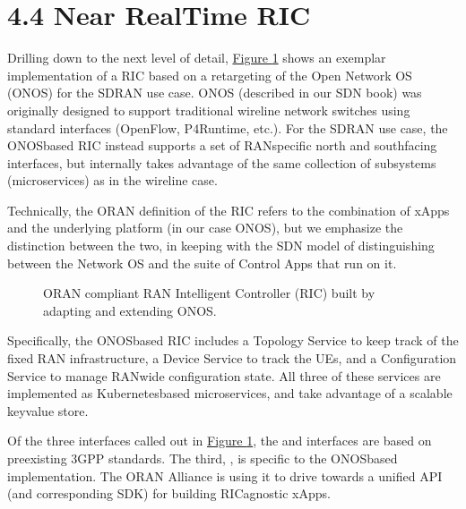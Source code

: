 \documentclass[a4paper,11pt,english]{sphinxmanual}
\let\sphinxpxdimen\pdfpxdimen\else\newdimen\sphinxpxdimen
\begin{document}
\section{4.4 Near Real\sphinxhyphen{}Time RIC}
\label{\detokenize{ran:near-real-time-ric}}
\sphinxAtStartPar
Drilling down to the next level of detail, \hyperref[\detokenize{ran:fig-ric}]{Figure \ref{\detokenize{ran:fig-ric}}} shows an exemplar implementation of a RIC based on a
retargeting of the Open Network OS (ONOS) for the SD\sphinxhyphen{}RAN use
case. ONOS (described in our SDN book) was originally designed to
support traditional wireline network switches using standard
interfaces (OpenFlow, P4Runtime, etc.). For the SD\sphinxhyphen{}RAN use case, the
ONOS\sphinxhyphen{}based RIC instead supports a set of RAN\sphinxhyphen{}specific north\sphinxhyphen{} and
south\sphinxhyphen{}facing interfaces, but internally takes advantage of the same
collection of subsystems (microservices) as in the wireline case.%
\begin{footnote}[2]\sphinxAtStartFootnote
Technically, the O\sphinxhyphen{}RAN definition of the RIC refers to the
combination of xApps and the underlying platform (in our case
ONOS), but we emphasize the distinction between the two, in keeping
with the SDN model of distinguishing between the Network OS
and the suite of Control Apps that run on it.
%
\end{footnote}

\begin{figure}[ht]
\centering
\capstart

\noindent\sphinxincludegraphics[width=400\sphinxpxdimen]{{Slide62}.png}
\caption{O\sphinxhyphen{}RAN compliant RAN Intelligent Controller (RIC) built by adapting
and extending ONOS.}\label{\detokenize{ran:id11}}\label{\detokenize{ran:fig-ric}}\end{figure}

\sphinxAtStartPar
Specifically, the ONOS\sphinxhyphen{}based RIC includes a Topology Service to keep
track of the fixed RAN infrastructure, a Device Service to track the
UEs, and a Configuration Service to manage RAN\sphinxhyphen{}wide configuration
state. All three of these services are implemented as Kubernetes\sphinxhyphen{}based
microservices, and take advantage of a scalable key\sphinxhyphen{}value store.

\sphinxAtStartPar
Of the three interfaces called out in \hyperref[\detokenize{ran:fig-ric}]{Figure \ref{\detokenize{ran:fig-ric}}},
the  and  interfaces are based on pre\sphinxhyphen{}existing 3GPP
standards. The third, , is specific to the ONOS\sphinxhyphen{}based
implementation. The O\sphinxhyphen{}RAN Alliance is using it to drive towards a
unified API (and corresponding SDK) for building RIC\sphinxhyphen{}agnostic xApps.
\end{document}

